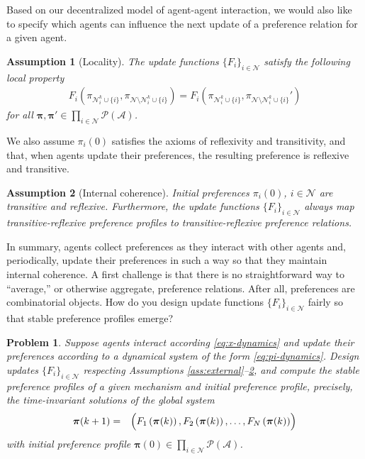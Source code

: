 \documentclass[conference]{ieeeconf}
\newcommand{\N}{\mathcal{N}}
\newcommand{\A}{\mathcal{A}}
\renewcommand{\P}{\mathcal{P}}
\newtheorem{assumption}{Assumption}
\newtheorem{problem}{Problem}
\begin{document}
Based on our decentralized model of agent-agent interaction, we would also like to specify which agents can influence the next update of a preference relation for a given agent.

\begin{assumption}[Locality]\label{ass:local}
    The update functions $\{F_i\}_{i \in \N}$ satisfy the following local property
\begin{align*}
    F_i \left(\pi_{\N_i^k\cup \{i\}}, \pi_{\N \setminus {\N_i^k \cup \{i\}}} \right) = F_i \left( \pi_{\N_i^k\cup \{i\}}, \pi_{\N \setminus {\N_i^k\cup \{i\}}}' \right)
\end{align*}
for all $\boldsymbol{\pi}, \boldsymbol{\pi}' \in \prod_{i \in \N} \P(\A)$.
\end{assumption}

We also assume $\pi_i(0)$ satisfies the axioms of reflexivity and transitivity, and that, when agents update their preferences, the resulting preference is reflexive and transitive.

\begin{assumption}[Internal coherence] \label{ass:internal}
    Initial preferences $\pi_i(0)$, $i \in \N$ are transitive and reflexive. Furthermore, the update functions $\{ F_i \}_{i \in \N}$ always map transitive-reflexive preference profiles to transitive-reflexive preference relations.
\end{assumption}

In summary, agents collect preferences as they interact with other agents and, periodically, update their preferences in such a way so that they maintain internal coherence. A first challenge is that there is no straightforward way to ``average,'' or otherwise aggregate, preference relations. After all, preferences are combinatorial objects. How do you design update functions $\{F_i\}_{i \in \N}$ fairly so that stable preference profiles emerge?

\begin{problem} \label{prob:dynamics}
    Suppose agents interact according \eqref{eq:x-dynamics} and update their preferences according to a dynamical system of the form \eqref{eq:pi-dynamics}. Design updates $\{F_i\}_{i \in \N}$ respecting Assumptions \ref{ass:external}--\ref{ass:internal}, and compute the stable preference profiles of a given mechanism and initial preference profile, precisely, the time-invariant solutions of the global system
    \begin{align}
    \begin{aligned}
        \boldsymbol{\pi}(k+1) &=& \Bigl( F_1\left(\boldsymbol{\pi}(k)\right), F_2\left(\boldsymbol{\pi}(k)\right), \dots, F_N\left(\boldsymbol{\pi}(k)\right)\Bigr)
    \end{aligned} \label{eq:pi-global-dynamics}
    \end{align}
    with initial preference profile $\boldsymbol{\pi}(0) \in \prod_{i \in \N} \P(\A)$.
\end{problem}
\end{document}
